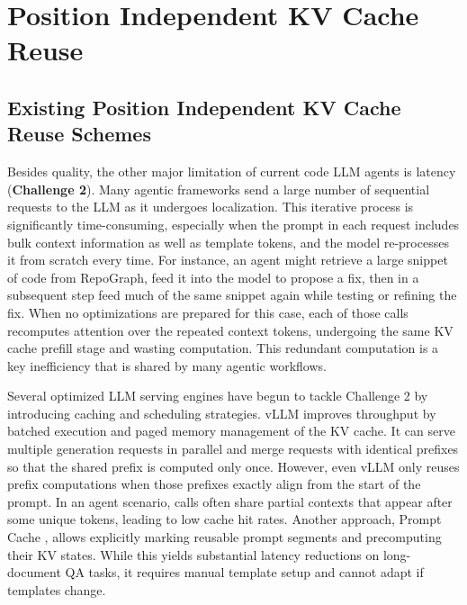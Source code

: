 \chapter{Position Independent KV Cache Reuse}
\label{cha:ch2}

\section{Existing Position Independent KV Cache Reuse Schemes}
\label{sec:ch2_intro}



Besides quality, the other major limitation of current code LLM agents is latency (\textbf{Challenge 2}). Many agentic frameworks send a large number of sequential requests to the LLM as it undergoes localization. This iterative process is significantly time-consuming, especially when the prompt in each request includes bulk context information as well as template tokens, and the model re-processes it from scratch every time. For instance, an agent might retrieve a large snippet of code from RepoGraph, feed it into the model to propose a fix, then in a subsequent step feed much of the same snippet again while testing or refining the fix. When no optimizations are prepared for this case, each of those calls recomputes attention over the repeated context tokens, undergoing the same KV cache prefill stage and wasting computation. This redundant computation is a key inefficiency that is shared by many agentic workflows.


Several optimized LLM serving engines have begun to tackle Challenge 2 by introducing caching and scheduling strategies. vLLM \cite{kwon2023vllm} improves throughput by batched execution and paged memory management of the KV cache. It can serve multiple generation requests in parallel and merge requests with identical prefixes so that the shared prefix is computed only once. However, even vLLM only reuses prefix computations when those prefixes exactly align from the start of the prompt. In an agent scenario, calls often share partial contexts that appear after some unique tokens, leading to low cache hit rates. Another approach, Prompt Cache \cite{gim2024promptcachemodularattention}, allows explicitly marking reusable prompt segments and precomputing their KV states. While this yields substantial latency reductions on long-document QA tasks, it requires manual template setup and cannot adapt if templates change.

